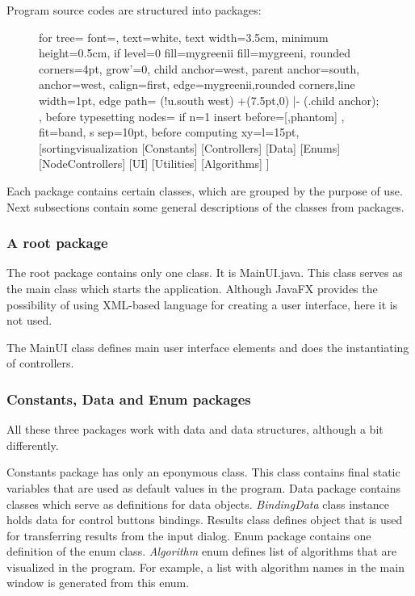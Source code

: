 \documentclass[
  field=inf,
  biblatex,
  language=english,
  glossaries,
  theorems=false,
  sourcecodes=false,
  index
]{kidiplom}
\begin{document}
Program source codes are structured into packages:
\begin{figure}[H]
	\begin{flushleft}
		\begin{forest}
			for tree={
    		font=\sffamily,
    		text=white,
    		text width=3.5cm,
    		minimum height=0.5cm,
    		if level=0
    		  {fill=mygreenii}
    		  {fill=mygreeni},
    		rounded corners=4pt,
    		grow'=0,
    		child anchor=west,
    		parent anchor=south,
    		anchor=west,
    		calign=first,
    		edge={mygreenii,rounded corners,line width=1pt},
    		edge path={
    		  \noexpand{}
    		  (!u.south west) +(7.5pt,0) |- (.child anchor);
		    },
    		before typesetting nodes={
      		if n=1
        		{insert before={[,phantom]}}
        		{}
    		},
    		fit=band,
    		s sep=10pt,
    		before computing xy={l=15pt},
  		}
		[sortingvisualization
		  [Constants]
  		  [Controllers]
		  [Data]
		  [Enums]
		  [NodeControllers]
		  [UI]
		  [Utilities]
		  [Algorithms]
		]
		\end{forest}
	\end{flushleft}
\end{figure}

Each package contains certain classes, which are grouped by the purpose of use. Next subsections contain some general descriptions of the classes from packages. 
\subsubsection{A root package}
The root package contains only one class. It is MainUI.java. This class serves as the main class which starts the application. Although JavaFX provides the possibility of using XML-based language for creating a user interface, here it is not used. 

The MainUI class defines main user interface elements and does the instantiating of controllers.

\subsubsection{Constants, Data and Enum packages}
All these three packages work with data and data structures, although a bit differently.

Constants package has only an eponymous class. This class contains final static variables that are used as default values in the program. Data package contains classes which serve as definitions for data objects. \textit{BindingData} class instance holds data for control buttons bindings. Results class defines object that is used for transferring results from the input dialog. Enum package contains one definition of the enum class. \textit{Algorithm} enum defines list of algorithms that are visualized in the program. For example, a list with algorithm names in the main window is generated from this enum.
\end{document}
